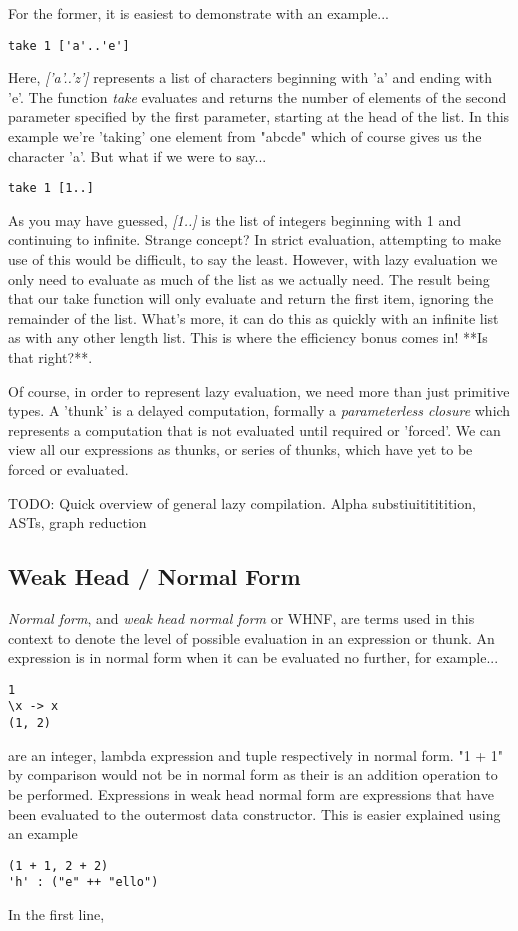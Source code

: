 \documentclass[11pt]{article}
\begin{document}
For the former, it is easiest to demonstrate with an example...
\begin{verbatim}
take 1 ['a'..'e']
\end{verbatim}
Here, \emph{['a'..'z']} represents a list of characters beginning with 'a' and 
ending with 'e'. The function \emph{take} evaluates and returns the number of
elements of the second parameter specified by the first parameter, starting at the
head of the list. In this example we're 'taking' one element from "abcde" which
of course gives us the character 'a'. But what if we were to say...
\begin{verbatim}
take 1 [1..]
\end{verbatim}
As you may have guessed, \emph{[1..]} is the list of integers beginning with 1
and continuing to infinite. Strange concept? In strict evaluation, attempting
to make use of this would be difficult, to say the least. However, with lazy 
evaluation we only need to evaluate as much of the list as we actually need.
The result being that our take function will only evaluate and return the 
first item, ignoring the remainder of the list. What's more, it can do this
as quickly with an infinite list as with any other length list. This is where the
efficiency bonus comes in! **Is that right?**. 

Of course, in order to represent lazy evaluation, we need more than just 
primitive types. A 'thunk' is a delayed computation, formally a \emph{
parameterless closure} which represents a computation that is not evaluated
until required or 'forced'. We can view all our expressions as thunks, or
series of thunks, which have yet to be forced or evaluated. 

TODO: Quick overview of general lazy compilation. Alpha substiuitititition,
ASTs, graph reduction

\subsection{Weak Head / Normal Form}
\emph{Normal form}, and \emph{weak head normal form} or WHNF, are terms used
in this context to denote the level of possible evaluation in an expression
or thunk. An expression is in normal form when it can be evaluated no further,
for example...
\begin{verbatim}
1
\x -> x
(1, 2)
\end{verbatim}
are an integer, lambda expression and tuple respectively in normal form. "1 + 1"
by comparison would not be in normal form as their is an addition operation to
be performed.
Expressions in weak head normal form are expressions that have been evaluated
to the outermost data constructor. This is easier explained using an example
\begin{verbatim}
(1 + 1, 2 + 2)
'h' : ("e" ++ "ello")
\end{verbatim}
In the first line, 
\end{document}
